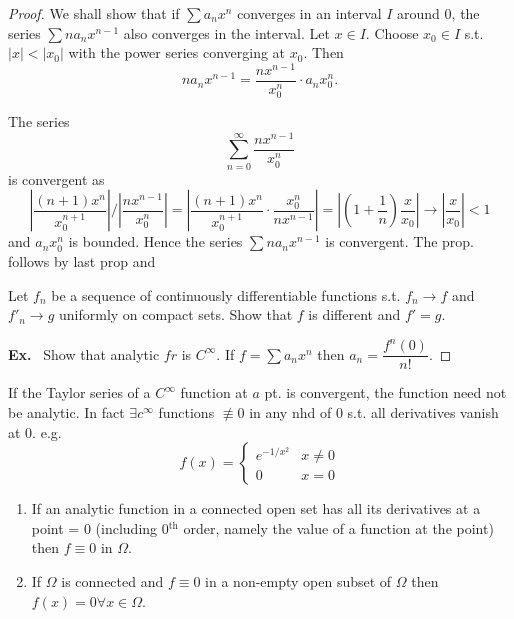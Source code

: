 \begin{proof}
We shall show that if $\sum a_{n}x^{n}$ converges in an interval $I$ around $0$, the series $\sum n a_{n}x^{n-1}$ also converges in the interval. Let $x\in I$. Choose $x_{0}\in I$ s.t. $|x|<|x_{0}|$ with the power series converging at $x_{0}$. Then 
$$
na_{n}x^{n-1}=\frac{nx^{n-1}}{x^{n}_{0}}\cdot a_{n}x^{n}_{0}.
$$\pageoriginale

The series
$$
\sum\limits^{\infty}_{n=0}\frac{nx^{n-1}}{x^{n}_{0}}
$$
is convergent as
$$
\left| \frac{(n+1)x^{n}}{x^{n+1}_{0}}\right| / \left|\frac{nx^{n-1}}{x^{n}_{0}}\right|=\left| \frac{(n+1)x^{n}}{x^{n+1}_{0}}\cdot \frac{x^{n}_{0}}{nx^{n-1}}\right|=\left| \left(1+\frac{1}{n}\right)\frac{x}{x_{0}}\right|\to \left|\frac{x}{x_{0}}\right|<1
$$
and $a_{n}x^{n}_{0}$ is bounded. Hence the series $\sum n a_{n}x^{n-1}$ is convergent. The prop. follows by last prop and
\begin{exer*}
Let $f_{n}$ be a sequence of continuously differentiable functions s.t. $f_{n}\to f$ and $f'_{n}\to g$ uniformly on compact sets. Show that $f$ is different and $f'=g$.
\end{exer*}

\noindent
{\bf Ex.}~ Show that analytic $fr$ is $C^{\infty}$. If $f=\sum a_{n}x^{n}$ then $a_{n}=\dfrac{f^{n}(0)}{n!}$.
\end{proof}

\begin{remark*}
If the Taylor series of a $C^{\infty}$ function at $a$ pt. is convergent, the function need not be analytic. In fact $\exists c^{\infty}$ functions $\nequiv 0$ in any nhd of $0$ s.t. all derivatives vanish at $0$. e.g.
$$
f(x)=
\begin{cases}
e^{-1/x^{2}} & x\neq 0\\
0 & x=0
\end{cases}
$$ 
\end{remark*}

\begin{prop*}
\begin{enumerate}
\item If an analytic function in a connected open set has all its derivatives at a point = 0 (including 0$^{\text{th}}$ order, namely the value of a function at the point) then $f\equiv 0$ in $\Omega$.

\item If $\Omega$ is connected and $f\equiv 0$ in a non-empty open subset of $\Omega$ then $f(x)=0\forall x\in \Omega$.
\end{enumerate}
\end{prop*}

